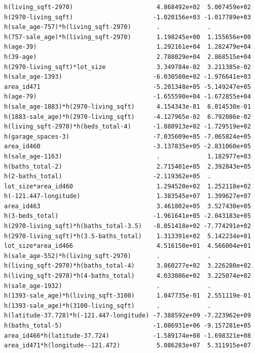 \documentclass[
]{article}
\begin{document}
\begin{verbatim}
h(living_sqft-2970)                       4.868492e+02  5.007459e+02
h(2970-living_sqft)                      -1.020156e+03 -1.017789e+03
h(sale_age-757)*h(living_sqft-2970)       .             .           
h(757-sale_age)*h(living_sqft-2970)       1.198245e+00  1.155656e+00
h(age-39)                                 1.292161e+04  1.282479e+04
h(39-age)                                 2.788029e+04  2.868515e+04
h(2970-living_sqft)*lot_size              3.349784e-02  3.211385e-02
h(sale_age-1393)                         -6.030580e+02 -1.976641e+03
area_id471                               -5.201348e+05 -5.149247e+05
h(age-79)                                -1.655590e+04 -1.672855e+04
h(sale_age-1883)*h(2970-living_sqft)      4.154343e-01  6.014530e-01
h(1883-sale_age)*h(2970-living_sqft)     -4.127965e-02  6.792086e-02
h(living_sqft-2970)*h(beds_total-4)      -1.880913e+02 -1.729519e+02
h(garage_spaces-3)                       -7.035609e+05 -7.065824e+05
area_id460                               -3.137835e+05 -2.831060e+05
h(sale_age-1163)                          .             1.182977e+03
h(baths_total-2)                          2.715401e+05  2.392843e+05
h(2-baths_total)                         -2.119362e+05  .           
lot_size*area_id460                       1.294520e+02  1.252118e+02
h(-121.447-longitude)                     1.383545e+07  1.399627e+07
area_id463                                3.461802e+05  3.527430e+05
h(3-beds_total)                          -1.961641e+05 -2.043183e+05
h(2970-living_sqft)*h(baths_total-3.5)   -8.051418e+02 -7.774291e+02
h(2970-living_sqft)*h(3.5-baths_total)    1.313391e+02  5.142234e+01
lot_size*area_id466                       4.516150e+01  4.566004e+01
h(sale_age-552)*h(living_sqft-2970)       .             .           
h(living_sqft-2970)*h(baths_total-4)      3.860277e+02  3.226280e+02
h(living_sqft-2970)*h(4-baths_total)      4.033086e+02  3.225074e+02
h(sale_age-1932)                          .             .           
h(1393-sale_age)*h(living_sqft-3100)      1.047735e-01  2.551119e-01
h(1393-sale_age)*h(3100-living_sqft)      .             .           
h(latitude-37.728)*h(-121.447-longitude) -7.388592e+09 -7.223962e+09
h(baths_total-5)                         -1.086931e+06 -9.157281e+05
area_id466*h(latitude-37.724)            -1.589174e+08 -1.698321e+08
area_id471*h(longitude--121.472)          5.086283e+07  5.311915e+07
                                                                    

\end{verbatim}
\end{document}
